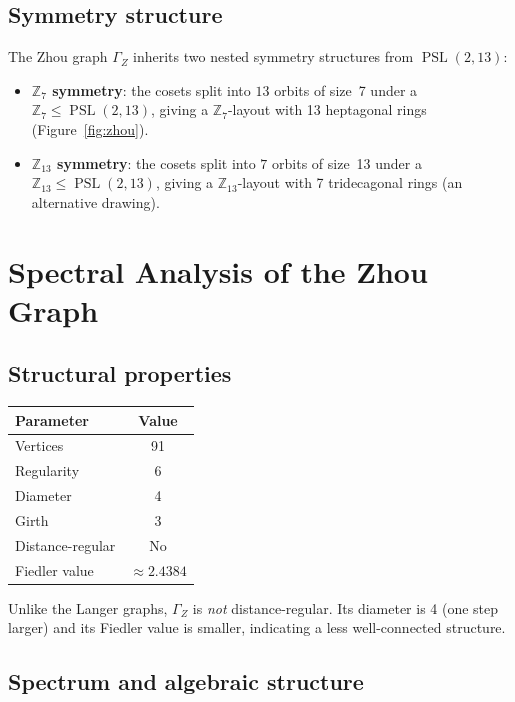 \documentclass[11pt,a4paper]{article}
\theoremstyle{plain}
\theoremstyle{definition}
\newcommand{\PSL}{\operatorname{PSL}}
\begin{document}
\subsection{Symmetry structure}

The Zhou graph $\Gamma_Z$ inherits two nested symmetry structures from
$\PSL(2,13)$:
\begin{itemize}
\item \textbf{$\mathbb{Z}_7$ symmetry}: the cosets split into $13$ orbits of
  size~7 under a $\mathbb{Z}_7 \leq \PSL(2,13)$, giving a $\mathbb{Z}_7$-layout
  with 13 heptagonal rings (Figure~\ref{fig:zhou}).
\item \textbf{$\mathbb{Z}_{13}$ symmetry}: the cosets split into $7$ orbits of
  size~13 under a $\mathbb{Z}_{13} \leq \PSL(2,13)$, giving a
  $\mathbb{Z}_{13}$-layout with 7 tridecagonal rings (an alternative drawing).
\end{itemize}

\section{Spectral Analysis of the Zhou Graph}

\subsection{Structural properties}

\begin{tcolorbox}[breakable, colback=black!5, colframe=black!5,
  boxrule=0pt, sharp corners]
\begin{center}
\begin{tabular}{lc}
\toprule
Parameter & Value \\
\midrule
Vertices & 91 \\
Regularity & 6 \\
Diameter & 4 \\
Girth & 3 \\
Distance-regular & No \\
Fiedler value & $\approx 2.4384$ \\
\bottomrule
\end{tabular}
\end{center}
Unlike the Langer graphs, $\Gamma_Z$ is \emph{not} distance-regular.
Its diameter is 4 (one step larger) and its Fiedler value is smaller,
indicating a less well-connected structure.
\end{tcolorbox}

\subsection{Spectrum and algebraic structure}
\end{document}

